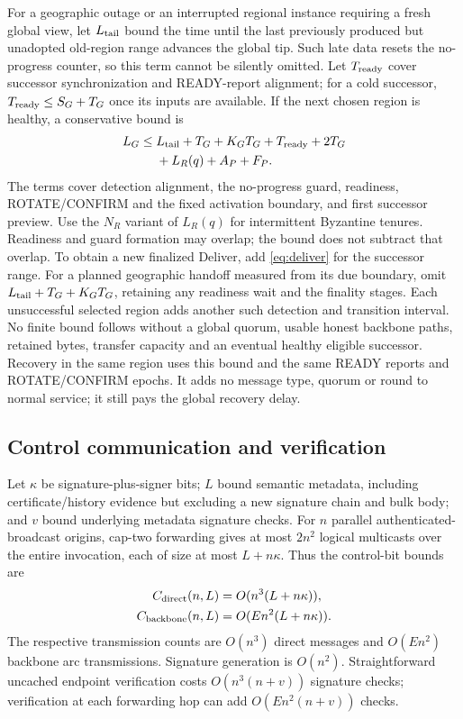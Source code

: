 \documentclass[11pt,a4paper,onecolumn]{article}
\theoremstyle{remark}\newtheorem{example}[definition]{Example}
\begin{document}
For a geographic outage or an interrupted regional instance requiring a fresh
global view, let $L_{\rm tail}$ bound the time until the last
previously produced but unadopted old-region range advances the global tip.
Such late data resets the no-progress counter, so this term cannot be silently
omitted. Let $T_{\rm ready}$ cover successor synchronization and READY-report
alignment; for a cold successor, $T_{\rm ready}\leq S_G+T_G$ once its inputs are
available. If the next chosen region is healthy, a conservative bound is
\begin{equation}\label{eq:georecover}
\begin{split}
 L_G\leq{}&L_{\rm tail}+T_G+K_GT_G+T_{\rm ready}+2T_G\\
          &{}+L_R(q)+A_P+F_P.
\end{split}
\end{equation}
The terms cover detection alignment, the no-progress guard, readiness,
ROTATE/CONFIRM and the fixed activation boundary, and first successor preview.
Use the $N_R$ variant of $L_R(q)$ for intermittent Byzantine tenures.
Readiness and guard formation may overlap; the bound does not subtract that
overlap. To obtain a new finalized Deliver, add \eqref{eq:deliver} for the
successor range. For a planned geographic handoff measured from its due boundary,
omit $L_{\rm tail}+T_G+K_GT_G$, retaining any readiness wait and the finality
stages. Each unsuccessful selected region adds another such detection and
transition interval. No finite bound follows without a global quorum, usable
honest backbone paths, retained bytes, transfer capacity and an eventual healthy
eligible successor. Recovery in the same region uses this bound and the same
READY reports and ROTATE/CONFIRM epochs. It adds no message type, quorum or
round to normal service; it still pays the global recovery delay.

\subsection{Control communication and verification}\label{sec:controlcost}
Let $\kappa$ be signature-plus-signer bits; $L$ bound semantic metadata,
including certificate/history evidence but excluding a new signature chain
and bulk body; and $v$ bound underlying metadata signature checks.
For $n$ parallel authenticated-broadcast origins, cap-two forwarding gives at
most $2n^2$ logical multicasts over the entire invocation, each of size at most
$L+n\kappa$. Thus the control-bit bounds are
\begin{align}
 C_{\rm direct}(n,L)&=O(n^3(L+n\kappa)),\label{eq:directcost}\\
 C_{\rm backbone}(n,L)&=O(En^2(L+n\kappa)).\label{eq:backbonecost}
\end{align}
The respective transmission counts are $O(n^3)$ direct messages and $O(En^2)$
backbone arc transmissions. Signature generation is $O(n^2)$. Straightforward
uncached endpoint verification costs $O(n^3(n+v))$ signature checks; verification
at each forwarding hop can add $O(En^2(n+v))$ checks.
\end{document}
